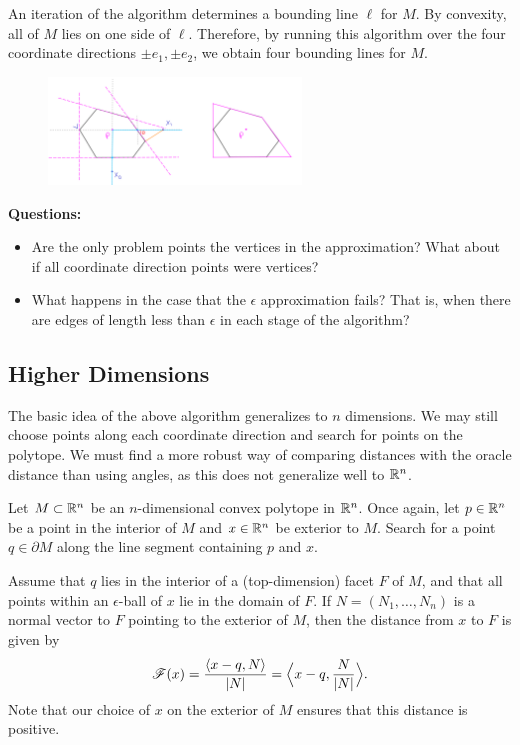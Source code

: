 \documentclass[12pt]{article}
\begin{document}
\begin{flushleft}
An iteration of the algorithm determines a bounding line $\ell$ for $M$.
By convexity, all of $M$ lies on one side of $\ell$.
Therefore, by running this algorithm over the four coordinate directions $\pm e_1,\pm e_2$, we obtain four bounding lines for $M$.
\begin{figure}[H]
	\centering
	\includegraphics[width=0.6\textwidth]{complete.png}
\end{figure}

\textbf{Questions:}
\begin{itemize}
	\item Are the only problem points the vertices in the approximation?
		What about if all coordinate direction points were vertices?
	\item What happens in the case that the $\epsilon$ approximation fails?
		That is, when there are edges of length less than $\epsilon$ in each stage of the algorithm?
\end{itemize}

\subsection{Higher Dimensions}

The basic idea of the above algorithm generalizes to $n$ dimensions.
We may still choose points along each coordinate direction and search for points on the polytope.
We must find a more robust way of comparing distances with the oracle distance than using angles, as this does not generalize well to $\mathbb{R}^n$.

Let $M\subset\mathbb{R}^n$ be an $n$-dimensional convex polytope in $\mathbb{R}^n$.
Once again, let $p\in\mathbb{R}^n$ be a point in the interior of $M$ and $x\in\mathbb{R}^n$ be exterior to $M$.
Search for a point $q\in \partial M$ along the line segment containing $p$ and $x$.

Assume that $q$ lies in the interior of a (top-dimension) facet $F$ of $M$, and that all points within an $\epsilon$-ball of $x$ lie in the domain of $F$.
If $N=(N_1,\dots, N_n)$ is a normal vector to $F$ pointing to the exterior of $M$, then the distance from $x$ to $F$ is given by 
\[\mathscr{F}(x) = \frac{\langle x-q,N\rangle}{\lvert N\rvert}=\Big\langle x-q,\frac{N}{\lvert N\rvert}\Big\rangle.\]
Note that our choice of $x$ on the exterior of $M$ ensures that this distance is positive.


\end{flushleft}
\end{document}
